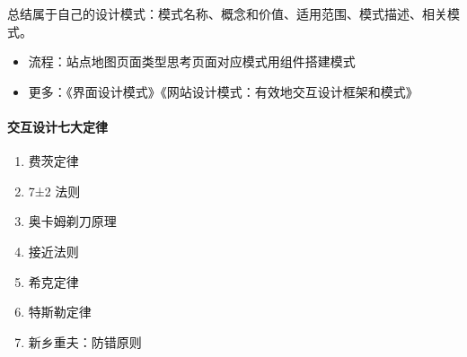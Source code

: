 \documentclass[letterpaper,11pt,english]{sphinxmanual}
\begin{document}
总结属于自己的设计模式：模式名称、概念和价值、适用范围、模式描述、相关模式。
\begin{itemize}
\item {} 
流程：站点地图\sphinxhyphen{}页面类型\sphinxhyphen{}思考页面对应模式\sphinxhyphen{}用组件搭建模式

\item {} 
更多：《界面设计模式》《网站设计模式：有效地交互设计框架和模式》

\end{itemize}


\paragraph{交互设计七大定律}
\label{\detokenize{chapter_idea/design:id4}}\begin{enumerate}
%
\item {} 
费茨定律

\item {} 
7±2 法则

\item {} 
奥卡姆剃刀原理

\item {} 
接近法则

\item {} 
希克定律

\item {} 
特斯勒定律

\item {} 
新乡重夫：防错原则

\end{enumerate}
\end{document}
